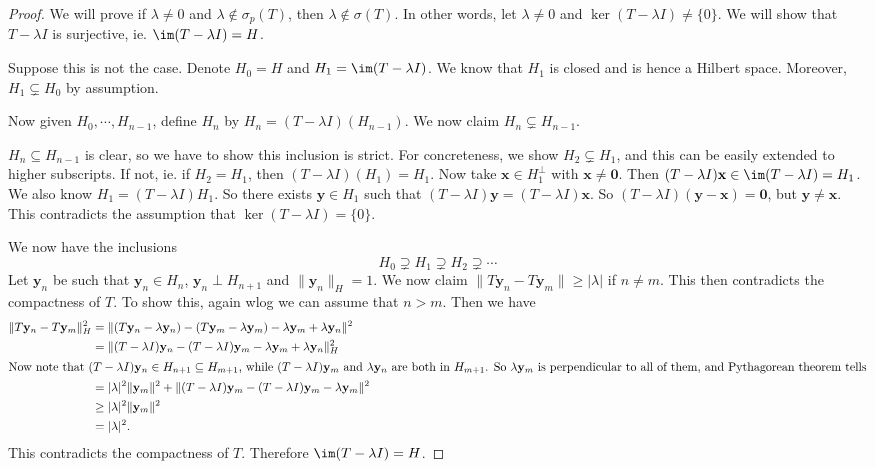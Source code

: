 \documentclass[a4paper]{article}
\begin{document}
\begin{proof}
  We will prove if $\lambda \not= 0$ and $\lambda \not\in \sigma_p(T)$, then $\lambda\not\in \sigma(T)$. In other words, let $\lambda \not= 0$ and $\ker (T - \lambda I) \not= \{0\}$. We will show that $T - \lambda I$ is surjective, ie. $\im (T - \lambda I) = H$.

  Suppose this is not the case. Denote $H_0 = H$ and $H_1 = \im (T - \lambda I)$. We know that $H_1$ is closed and is hence a Hilbert space. Moreover, $H_1 \subsetneq H_0$ by assumption.

  Now given $H_0, \cdots, H_{n - 1}$, define $H_n$ by $H_n = (T - \lambda I)(H_{n - 1})$. We now claim $H_n \subsetneq H_{n - 1}$.

  $H_n \subseteq H_{n - 1}$ is clear, so we have to show this inclusion is strict. For concreteness, we show $H_2 \subsetneq H_1$, and this can be easily extended to higher subscripts. If not, ie. if $H_2 = H_1$, then $(T - \lambda I)(H_1) = H_1$. Now take $\mathbf{x} \in H_1^\perp$ with $\mathbf{x}\not= \mathbf{0}$. Then $(T - \lambda I) \mathbf{x} \in \im (T - \lambda I) = H_1$. We also know $H_1 = (T - \lambda I)H_1$. So there exists $\mathbf{y} \in H_1$ such that $(T - \lambda I)\mathbf{y} = (T - \lambda I)\mathbf{x}$. So $(T - \lambda I)(\mathbf{y} - \mathbf{x}) = \mathbf{0}$, but $\mathbf{y} \not= \mathbf{x}$. This contradicts the assumption that $\ker(T - \lambda I) = \{0\}$.

  We now have the inclusions
  \[
    H_0 \supsetneq H_1 \supsetneq H_2 \supsetneq \cdots
  \]
  Let $\mathbf{y}_n$ be such that $\mathbf{y}_n \in H_n$, $\mathbf{y}_n \perp H_{n + 1}$ and $\|\mathbf{y}_n\|_H = 1$. We now claim $\|T \mathbf{y}_n - T \mathbf{y}_m\| \geq |\lambda|$ if $n \not= m$. This then contradicts the compactness of $T$. To show this, again wlog we can assume that $n > m$. Then we have
  \begin{align*}
    \|T \mathbf{y}_n - T \mathbf{y}_m\|_H^2 &= \|(T \mathbf{y}_n - \lambda\mathbf{y}_n) - (T \mathbf{y}_m - \lambda\mathbf{y}_m) - \lambda\mathbf{y}_m + \lambda\mathbf{y}_n\|^2\\
    &= \|(T - \lambda I) \mathbf{y}_n - (T - \lambda I) \mathbf{y}_m - \lambda \mathbf{y}_m + \lambda \mathbf{y}_n\|^2_H\\
    \intertext{Now note that $(T - \lambda I)\mathbf{y} _n \in H_{n + 1}\subseteq H_{m + 1}$, while $(T - \lambda I)\mathbf{y}_m$ and $\lambda \mathbf{y}_n$ are both in $H_{m + 1}$. So $\lambda \mathbf{y}_m$ is perpendicular to all of them, and Pythagorean theorem tells}
    &= |\lambda|^2 \|\mathbf{y}_m\|^2 + \|(T - \lambda I)\mathbf{y}_m - (T - \lambda I)\mathbf{y}_m - \lambda \mathbf{y}_m\|^2\\
    &\geq |\lambda|^2 \|\mathbf{y}_m\|^2\\
    &= |\lambda|^2.
  \end{align*}
  This contradicts the compactness of $T$. Therefore $\im (T - \lambda I) = H$.
\end{proof}
\end{document}
